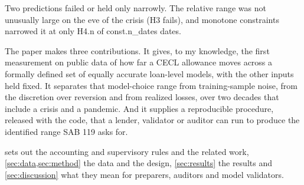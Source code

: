 \noindent Two predictions failed or held only narrowly. The relative range was
not unusually large on the eve of the crisis (H3 fails), and monotone
constraints narrowed it at only \num{H4.n} of \num{const.n_dates} dates.

The paper makes three contributions. It gives, to my knowledge, the first measurement on public
data of how far a CECL allowance moves across a formally defined set of
equally accurate loan-level models, with the other inputs held fixed. It
separates that model-choice range from training-sample noise, from the discretion over
reversion and from realized losses, over two decades that include a crisis
and a pandemic. And it supplies a reproducible procedure, released with the
code, that a lender, validator or auditor can run to produce the identified
range SAB 119 asks for.

 sets out the accounting and supervisory rules and the
related work, \cref{sec:data,sec:method} the data and the design,
\cref{sec:results} the results and \cref{sec:discussion} what they mean for
preparers, auditors and model validators.
